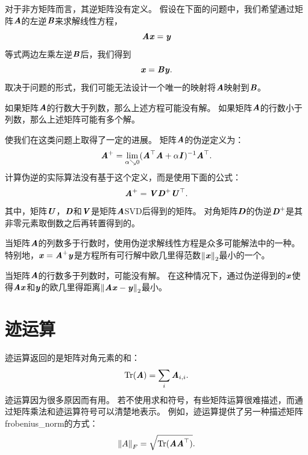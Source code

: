 对于非方矩阵而言，其逆矩阵没有定义。
假设在下面的问题中，我们希望通过矩阵$\MA$的左逆$\MB$来求解线性方程，
\begin{equation}
    \MA\Vx=\Vy
\end{equation}
等式两边左乘左逆$\MB$后，我们得到
\begin{equation}
    \Vx=\MB\Vy.
\end{equation}
取决于问题的形式，我们可能无法设计一个唯一的映射将$\MA$映射到$\MB$。


如果矩阵$\MA$的行数大于列数，那么上述方程可能没有解。
如果矩阵$\MA$的行数小于列数，那么上述矩阵可能有多个解。


使我们在这类问题上取得了一定的进展。
矩阵$\MA$的伪逆定义为：
\begin{equation}
    \MA^+ = \lim_{\alpha \searrow 0} (\MA^\top\MA + \alpha \MI)^{-1} \MA^\top.
\end{equation}
计算伪逆的实际算法没有基于这个定义，而是使用下面的公式：
\begin{equation}
    \MA^+ = \MV\MD^+\MU^\top.
\end{equation}
其中，矩阵$\MU$，$\MD$和$\MV$是矩阵$\MA$\gls{SVD}后得到的矩阵。
对角矩阵$\MD$的伪逆$\MD^+$是其非零元素取倒数之后再转置得到的。


当矩阵$\MA$的列数多于行数时，使用伪逆求解线性方程是众多可能解法中的一种。
特别地，$\Vx=\MA^+\Vy$是方程所有可行解中欧几里得范数$\norm{\Vx}_2$最小的一个。


当矩阵$\MA$的行数多于列数时，可能没有解。
在这种情况下，通过伪逆得到的$\Vx$使得$\MA\Vx$和$\Vy$的欧几里得距离$\norm{\MA\Vx-\Vy}_2$最小。





\section{迹运算}
\label{sec:the_trace_operator}

迹运算返回的是矩阵对角元素的和：
\begin{equation}
    \Tr(\MA)= \sum_i \MA_{i,i}.
\end{equation}
迹运算因为很多原因而有用。
若不使用求和符号，有些矩阵运算很难描述，而通过矩阵乘法和迹运算符号可以清楚地表示。
例如，迹运算提供了另一种描述矩阵\gls{frobenius_norm}的方式：
\begin{equation}
    \norm{A}_F = \sqrt{\text{Tr}(\MA \MA^\top)}.
    \label{eq:2.49}
\end{equation}


